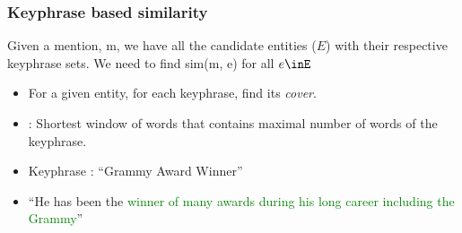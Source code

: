 
\begin{frame}
 \frametitle{Keyphrase based similarity}
 Given a mention, m, we have all the candidate entities ($E$) with their respective keyphrase sets.
 We need to find sim(m, e) for all $e \inE$
 
 \begin{itemize}  
  \item For a given entity, for each keyphrase, find its \emph{cover}.  \medskip
  \item {} : Shortest window of words that contains maximal number of words of the keyphrase. \medskip
  \item Keyphrase : ``Grammy Award Winner'' \medskip
  \item ``He has been the  \textcolor{green}{winner of many awards during his long career including the Grammy}''  \medskip
\end{itemize} 

\end{frame}
